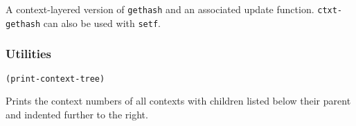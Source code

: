 A context-layered version of {\tt gethash} and an associated update
function.  {\tt ctxt-gethash} can also be used with {\tt setf}.

\subsubsection{Utilities}

\begin{tabbing}
{\tt (print-context-tree)}
\end{tabbing}

Prints the context numbers of all contexts with children listed
below their parent and indented further to the right.



